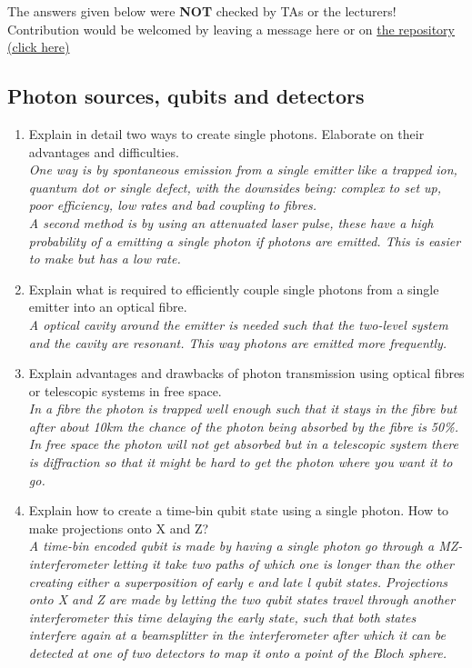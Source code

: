 \documentclass[a4paper]{scrartcl}
\newcommand{\qa}[2]{#1\\ \textit{#2}}
\begin{document}
{\color{blue} The answers given below were \textbf{NOT} checked by TAs or the lecturers!\\
Contribution would be welcomed by leaving a message here or on \href{https://github.com/SangersJeroen/AP3442}{ the repository (click here)} }

\subsection*{Photon sources, qubits and detectors}
\begin{enumerate}[label=(\alph*)]
  \item \qa{Explain in detail two ways to create single photons. Elaborate on their advantages and difficulties.}{One way is by spontaneous emission from a single emitter like a trapped ion, quantum dot or single defect, with the downsides being: complex to set up, poor efficiency, low rates and bad coupling to fibres.\\ A second method is by using an attenuated laser pulse, these have a high probability of a emitting a single photon if photons are emitted. This is easier to make but has a low rate.}
  \item \qa{Explain what is required to efficiently couple single photons from a single emitter into an optical fibre.}{A optical cavity around the emitter is needed such that the two-level system and the cavity are resonant. This way photons are emitted more frequently.}
  \item \qa{Explain advantages and drawbacks of photon transmission using optical fibres or telescopic systems in free space.}{In a fibre the photon is trapped well enough such that it stays in the fibre but after about 10km the chance of the photon being absorbed by the fibre is 50\%. In free space the photon will not get absorbed but in a telescopic system there is diffraction so that it might be hard to get the photon where you want it to go.}
  \item \qa{Explain how to create a time-bin qubit state using a single photon. How to make projections onto X and Z?}{A time-bin encoded qubit is made by having a single photon go through a MZ-interferometer letting it take two paths of which one is longer than the other creating either a superposition of early e and late l qubit states. Projections onto X and Z are made by letting the two qubit states travel through another interferometer this time delaying the early state, such that both states interfere again at a beamsplitter in the interferometer after which it can be detected at one of two detectors to map it onto a point of the Bloch sphere.}

\end{enumerate}
\end{document}
